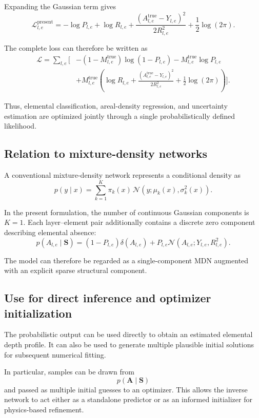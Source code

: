 \documentclass[11pt,a4paper]{article}
\begin{document}
Expanding the Gaussian term gives
\[
\boxed{
\mathcal{L}_{l,e}^{\mathrm{present}}
=
-\log P_{l,e}
+
\log R_{l,e}
+
\frac{
\left(
A_{l,e}^{\mathrm{true}}-Y_{l,e}
\right)^2
}{
2R_{l,e}^{2}
}
+
\frac{1}{2}\log(2\pi).
}
\]

The complete loss can therefore be written as
\[
\boxed{
\begin{aligned}
\mathcal{L}
=
\sum_{l,e}
\Bigg[
&
-\left(1-M_{l,e}^{\mathrm{true}}\right)
\log\left(1-P_{l,e}\right)
-M_{l,e}^{\mathrm{true}}\log P_{l,e}
\\
&
+
M_{l,e}^{\mathrm{true}}
\left(
\log R_{l,e}
+
\frac{
\left(
A_{l,e}^{\mathrm{true}}-Y_{l,e}
\right)^2
}{
2R_{l,e}^{2}
}
+
\frac{1}{2}\log(2\pi)
\right)
\Bigg].
\end{aligned}
}
\label{eq:loss}
\]

Thus, elemental classification, areal-density regression, and uncertainty estimation are optimized jointly through a single probabilistically defined likelihood.

\subsection{Relation to mixture-density networks}

A conventional mixture-density network represents a conditional density as
\[
p(y\mid x)
=
\sum_{k=1}^{K}
\pi_k(x)
\,
\mathcal{N}
\left(
y;
\mu_k(x),
\sigma_k^2(x)
\right).
\]

In the present formulation, the number of continuous Gaussian components is $K=1$. Each layer--element pair additionally contains a discrete zero component describing elemental absence:
\[
p(A_{l,e}\mid\bm{S})
=
(1-P_{l,e})\delta(A_{l,e})
+
P_{l,e}
\mathcal{N}
\left(
A_{l,e};
Y_{l,e},
R_{l,e}^{2}
\right).
\]

The model can therefore be regarded as a single-component MDN augmented with an explicit sparse structural component.

\subsection{Use for direct inference and optimizer initialization}

The probabilistic output can be used directly to obtain an estimated elemental depth profile. It can also be used to generate multiple plausible initial solutions for subsequent numerical fitting.

In particular, samples can be drawn from
\[
p(\bm{A}\mid\bm{S})
\]
and passed as multiple initial guesses to an optimizer. This allows the inverse network to act either as a standalone predictor or as an informed initializer for physics-based refinement.
\end{document}
